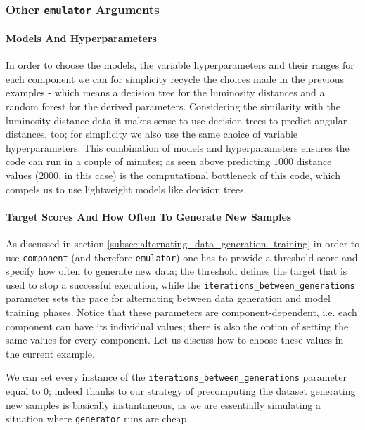 \subsubsection{Other \texttt{emulator} Arguments}
\paragraph{Models And Hyperparameters}
In order to choose the models, the variable hyperparameters and their ranges for each component we can for simplicity recycle the choices made in the previous examples - which means a decision tree for the luminosity distances and a random forest for the derived parameters. Considering the similarity with the luminosity distance data it makes sense to use decision trees to predict angular distances, too; for simplicity we also use the same choice of variable hyperparameters. This combination of models and hyperparameters ensures the code can run in a couple of minutes; as seen above predicting $1000$ distance values ($2000$, in this case) is the computational bottleneck of this code, which compels us to use lightweight models like decision trees.

\paragraph{Target Scores And How Often To Generate New Samples}
As discussed in section \ref{subsec:alternating_data_generation_training} in order to use \texttt{component} (and therefore \texttt{emulator}) one has to provide a threshold score and specify how often to generate new data; the threshold defines the target that is used to stop a successful execution, while the \texttt{iterations\_between\_generations} parameter sets the pace for alternating between data generation and model training phases. Notice that these parameters are component-dependent, i.e. each component can have its individual values; there is also the option of setting the same values for every component. 
Let us discuss how to choose these values in the current example.

We can set every instance of the \texttt{iterations\_between\_generations} parameter equal to $0$; indeed thanks to our strategy of precomputing the dataset generating new samples is basically instantaneous, as we are essentially simulating a situation where \texttt{generator} runs are cheap.

